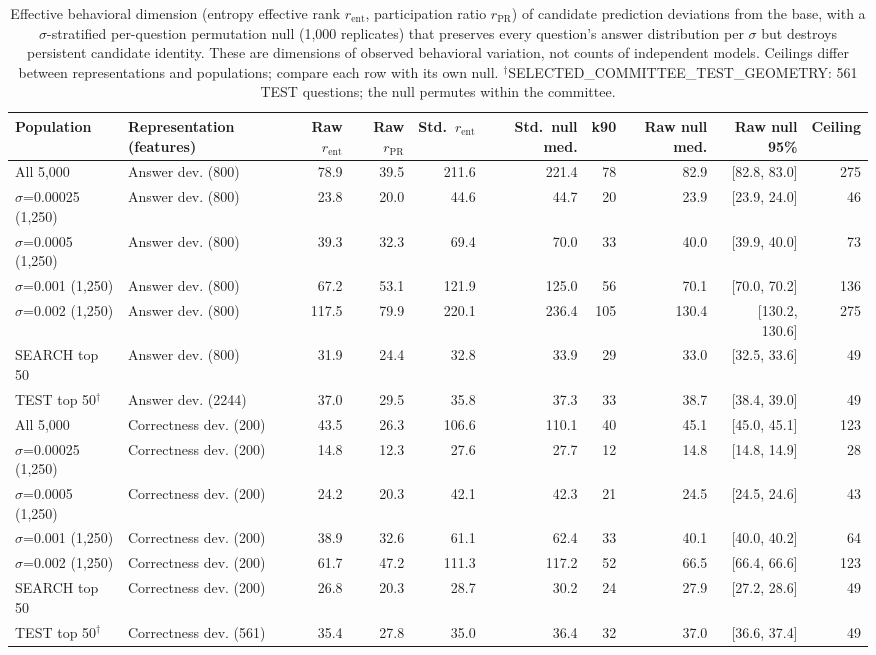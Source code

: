\begin{table}[t]
\centering
\small
\begin{adjustbox}{max width=\linewidth}
\begin{tabular}{llrrrrrrrr}
\toprule
Population & Representation (features) & Raw $r_{\mathrm{ent}}$ & Raw $r_{\mathrm{PR}}$ & Std.\ $r_{\mathrm{ent}}$ & Std.\ null med. & k90 & Raw null med. & Raw null 95\% & Ceiling \\
\midrule
All 5,000 & Answer dev. (800) & 78.9 & 39.5 & 211.6 & 221.4 & 78 & 82.9 & [82.8, 83.0] & 275 \\
$\sigma$=0.00025 (1,250) & Answer dev. (800) & 23.8 & 20.0 & 44.6 & 44.7 & 20 & 23.9 & [23.9, 24.0] & 46 \\
$\sigma$=0.0005 (1,250) & Answer dev. (800) & 39.3 & 32.3 & 69.4 & 70.0 & 33 & 40.0 & [39.9, 40.0] & 73 \\
$\sigma$=0.001 (1,250) & Answer dev. (800) & 67.2 & 53.1 & 121.9 & 125.0 & 56 & 70.1 & [70.0, 70.2] & 136 \\
$\sigma$=0.002 (1,250) & Answer dev. (800) & 117.5 & 79.9 & 220.1 & 236.4 & 105 & 130.4 & [130.2, 130.6] & 275 \\
SEARCH top 50 & Answer dev. (800) & 31.9 & 24.4 & 32.8 & 33.9 & 29 & 33.0 & [32.5, 33.6] & 49 \\
TEST top 50$^\dagger$ & Answer dev. (2244) & 37.0 & 29.5 & 35.8 & 37.3 & 33 & 38.7 & [38.4, 39.0] & 49 \\
\midrule
All 5,000 & Correctness dev. (200) & 43.5 & 26.3 & 106.6 & 110.1 & 40 & 45.1 & [45.0, 45.1] & 123 \\
$\sigma$=0.00025 (1,250) & Correctness dev. (200) & 14.8 & 12.3 & 27.6 & 27.7 & 12 & 14.8 & [14.8, 14.9] & 28 \\
$\sigma$=0.0005 (1,250) & Correctness dev. (200) & 24.2 & 20.3 & 42.1 & 42.3 & 21 & 24.5 & [24.5, 24.6] & 43 \\
$\sigma$=0.001 (1,250) & Correctness dev. (200) & 38.9 & 32.6 & 61.1 & 62.4 & 33 & 40.1 & [40.0, 40.2] & 64 \\
$\sigma$=0.002 (1,250) & Correctness dev. (200) & 61.7 & 47.2 & 111.3 & 117.2 & 52 & 66.5 & [66.4, 66.6] & 123 \\
SEARCH top 50 & Correctness dev. (200) & 26.8 & 20.3 & 28.7 & 30.2 & 24 & 27.9 & [27.2, 28.6] & 49 \\
TEST top 50$^\dagger$ & Correctness dev. (561) & 35.4 & 27.8 & 35.0 & 36.4 & 32 & 37.0 & [36.6, 37.4] & 49 \\
\bottomrule
\end{tabular}
\end{adjustbox}
\caption{Effective behavioral dimension (entropy effective rank $r_{\mathrm{ent}}$, participation ratio $r_{\mathrm{PR}}$) of candidate prediction deviations from the base, with a $\sigma$-stratified per-question permutation null (1,000 replicates) that preserves every question's answer distribution per $\sigma$ but destroys persistent candidate identity. These are dimensions of observed behavioral variation, not counts of independent models. Ceilings differ between representations and populations; compare each row with its own null. $^\dagger$SELECTED\_COMMITTEE\_TEST\_GEOMETRY: 561 TEST questions; the null permutes within the committee.}
\label{tab:effective-dimension}
\end{table}
